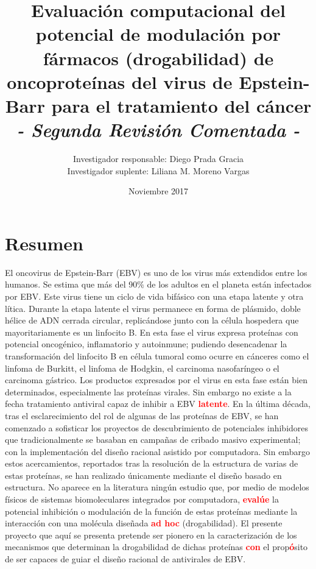 \documentclass[11pt,letterpaper,titlepage]{article} %
\title{\bf{Evaluación computacional del potencial de modulación por fármacos (drogabilidad) de oncoproteínas del
    virus de Epstein-Barr para el tratamiento del cáncer} \\
  \vspace*{1\baselineskip}
  \large{\emph{- Segunda Revisión Comentada -}}
  \vspace*{1\baselineskip}
}
\author[]{Investigador responsable: Diego Prada Gracia\\
  Investigador suplente: Liliana M. Moreno Vargas}
\affil{Unidad de Biología Computacional y Diseño de Fármacos.\\ Hospital Infantil de México Federico Gómez}
\date{Noviembre 2017}
\newcommand{\red}[1]{\textcolor{red}{\textbf{#1}}}
\newcommand{\tout}[1]{\red{\textst{#1}}}
\begin{document}
 
\begin{titlepage}
\maketitle
\end{titlepage}

\setcounter{tocdepth}{1}
\tableofcontents
\newpage
 

\section{Resumen}

El oncovirus de Epstein-Barr (EBV) es uno de los virus más extendidos entre los
humanos. Se estima que más del 90$\%$ de los adultos en el planeta están
infectados por EBV. Este virus tiene un ciclo de vida bifásico con una etapa
latente y otra lítica. Durante la etapa latente el virus permanece en forma de
plásmido, doble hélice de ADN cerrada circular, replicándose junto con la célula
hospedera que mayoritariamente es un linfocito B. En esta fase el virus expresa
proteínas con potencial oncogénico, inflamatorio y autoinmune; pudiendo
desencadenar la transformación del linfocito B en célula tumoral como ocurre en
cánceres como el linfoma de Burkitt, el linfoma de Hodgkin, el carcinoma
nasofaríngeo o el carcinoma gástrico. Los productos expresados por el virus en
esta fase están bien determinados, especialmente las proteínas virales. Sin
embargo no existe a la fecha tratamiento antiviral capaz de inhibir a EBV
\tout{en latencia} \red{latente}. En la última década, tras el esclarecimiento
del rol de algunas de las proteínas de EBV, se han comenzado a sofisticar los
proyectos de descubrimiento de potenciales inhibidores que tradicionalmente se
basaban en campañas de cribado masivo experimental; con la implementación del
diseño racional asistido por computadora. Sin embargo estos acercamientos,
reportados tras la resolución de la estructura de varias de estas proteínas, se
han realizado únicamente mediante el diseño basado en estructura. No aparece en
la literatura ningún estudio que, por medio de modelos físicos de sistemas
biomoleculares integrados por computadora, \red{evalúe} la potencial inhibición
o modulación de la función de estas proteínas mediante la interacción con una
molécula diseñada \red{ad hoc} (drogabilidad). El presente proyecto que aquí se
presenta pretende ser pionero en la caracterización de los mecanismos que
determinan la drogabilidad de dichas proteínas \red{con} el prop\red{ó}sito de
ser capaces de guiar el diseño racional de antivirales de EBV.
\end{document}
